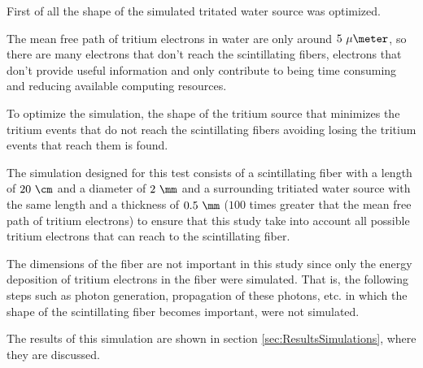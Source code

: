 First of all the shape of the simulated tritated water source was optimized. 

The mean free path of tritium electrons in water are only around $5~\mu\meter$, so there are many electrons that don't reach the scintillating fibers, electrons that don't provide useful information and only contribute to being time consuming and reducing available computing resources.

To optimize the simulation, the shape of the tritium source that minimizes the tritium events that do not reach the scintillating fibers avoiding losing the tritium events that reach them is found.

The simulation designed for this test consists of a scintillating fiber with a length of $20~\cm$ and a diameter of $2~\mm$ and a surrounding tritiated water source with the same length and a thickness of $0.5~\mm$ ($100$ times greater that the mean free path of tritium electrons) to ensure that this study take into account all possible tritium electrons that can reach to the scintillating fiber. 

The dimensions of the fiber are not important in this study since only the energy deposition of tritium electrons in the fiber were simulated. That is, the following steps such as photon generation, propagation of these photons, etc. in which the shape of the scintillating fiber becomes important, were not simulated.


The results of this simulation are shown in section \ref{sec:ResultsSimulations}, where they are discussed.
